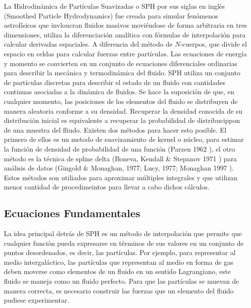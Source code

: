 \documentclass[a4paper,openright,10pt, oneside, final]{book}
\begin{document}
La Hidrodinámica de Partículas Suavizadas o SPH por sus siglas en inglés (Smoothed Particle Hydrodynamics) fue creada para simular fenómenos astrofísicos que invloucran fluidos masivos moviéndose de forma arbitraria en tres dimensiones, utiliza la diferenciación analítica con fórmulas de interpolación para calcular derivadas espaciales. A diferencia del método de $N$-cuerpos, que divide el espacio en celdas para calcular fuerzas entre partículas. Las ecuaciones de energía y momento se convierten en un conjunto de ecuaciones diferenciales ordinarias para describir la mecánica y termodinámica del fluido. SPH utiliza un conjunto de partículas discretas para describir el estado de un fluido con cantidades continuas asociadas a la dinámica de fluidos. Se hace la suposición de que, en cualquier momento, las posiciones de los elementos del fluido se  distribuyen de manera aleatoria conforme a su densidad. Recuperar la densidad conocida de su distribución inicial es equivalente a recuperar la probabilidad de distribucippon de una muestra del fliudo. Existen dos métodos para hacer esto posible. El primero de ellos es un metodo de suavizamiento de kernel o núcleo, para estimar la función de densidad de probabilidad de una función (Parzen 1962 \cite{b5.3}), el otro método es la técnica de spline delta (Boneva, Kendall \& Stepanov 1971 \cite{b5.4}) para análisis de datos (Gingold \& Monaghan, 1977; Lucy, 1977; Monaghan 1997 \cite{b6,b7}). Estos métodos son utiliados para aproximar múltiples integrales y que utilizan menor cantidad de procedimeintos para llevar a cabo dichos cálculos.

\subsection{Ecuaciones Fundamentales}
La idea principal detrás de SPH es un método de interpolación que permite que cualquier función pueda expresarse en términos de sus valores en un conjunto de puntos desordenados, es decir, las partículas. Por ejemplo, para representar al medio intergaláctico, las partículas que representan al medio en forma de gas deben moverse como elementos de un fluido en un sentido Lagrangiano, este fluido se maneja como un fluido perfecto. Para que las partículas se muevan de manera correcta, es necesario construir las fuerzas que un elemento del fluido pudiese experimentar. 
\end{document}
